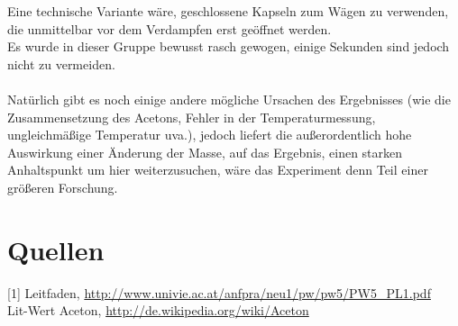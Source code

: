 \documentclass[12pt,a4paper]{article}
\begin{document}
\begin{multicols}{2}
Eine technische Variante wäre, geschlossene Kapseln zum Wägen zu verwenden, die unmittelbar vor dem Verdampfen erst geöffnet werden.\\
Es wurde in dieser Gruppe bewusst rasch gewogen, einige Sekunden sind jedoch nicht zu vermeiden.\\
\\
Natürlich gibt es noch einige andere mögliche Ursachen des Ergebnisses (wie die Zusammensetzung des Acetons, Fehler in der Temperaturmessung, ungleichmäßige Temperatur uva.), jedoch liefert die außerordentlich hohe Auswirkung einer Änderung der Masse, auf das Ergebnis, einen starken Anhaltspunkt um hier weiterzusuchen, wäre das Experiment denn Teil einer größeren Forschung.


\section{Quellen}
[1] Leitfaden, \url{http://www.univie.ac.at/anfpra/neu1/pw/pw5/PW5_PL1.pdf}\\
[2] Lit-Wert Aceton, \url{http://de.wikipedia.org/wiki/Aceton}

\end{multicols}
\end{document}
